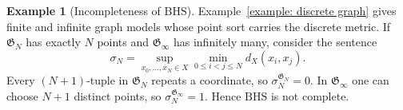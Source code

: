 \documentclass{amsart}
\theoremstyle{definition}
\newtheorem{example}{Example}[section]
\theoremstyle{remark}
\newtheorem{remark}[definition]{Remark}
\numberwithin{equation}{section}
\begin{document}


\begin{example}[Incompleteness of $\mathrm{BHS}$]
	\label{ex:BHS-incomplete}
	Example~\ref{example: discrete graph} gives finite and infinite graph models whose point sort carries the discrete metric. If $\mathfrak G_N$ has exactly $N$ points and $\mathfrak G_\infty$ has infinitely many, consider the sentence
	$$\sigma_N=\sup_{x_0,\ldots,x_N\in X}\min_{0\le i<j\le N}d_X(x_i,x_j).$$
	Every $(N+1)$-tuple in $\mathfrak G_N$ repeats a coordinate, so $\sigma_N^{\mathfrak G_N}=0$. In $\mathfrak G_\infty$ one can choose $N+1$ distinct points, so $\sigma_N^{\mathfrak G_\infty}=1$. Hence $\mathrm{BHS}$ is not complete.
	

\end{example}
\end{document}
